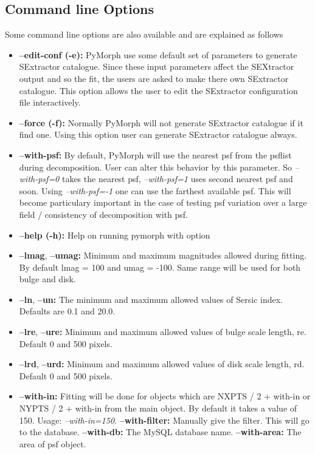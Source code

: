 \documentclass[a4paper,12pt]{article}
\begin{document}
\subsection{Command line Options}
Some command line options are also available and are explained as follows
\begin{itemize}
 \item 
\textbf{ --edit-conf (-e):} PyMorph use some default set of parameters to generate SExtractor catalogue. Since these input parameters affect the SEXtractor output and so the fit, the users are asked to make there own SExtractor  catalogue. This option allows the user to edit the SExtractor configuration file interactively.

\item
\textbf{ --force (-f): } Normally PyMorph will not generate SExtractor catalogue if it find one. Using this option user can generate SExtractor catalogue always.
\item
\textbf{ --with-psf: } By default, PyMorph will use the nearest psf from the psflist during decomposition. User can alter this behavior by this parameter. So \textit{--with-psf=0} takes the nearest psf, \textit{--with-psf=1} uses second nearest psf and soon. Using \textit{--with-psf=-1} one can use the farthest available psf. This will become particulary important in the case of testing psf variation over a large field / consistency of decomposition with psf.
\item
\textbf{ --help (-h): } Help on running pymorph with option
\item
\textbf{ --lmag}, \textbf{ --umag:} Minimum and maximum magnitudes allowed during fitting. By default lmag = 100 and umag = -100. Same range will be used for both bulge and disk.
\item
\textbf{ --ln}, \textbf{ --un: } The minimum and maximum allowed values of Sersic index. Defaults are 0.1 and 20.0.
\item
\textbf{ --lre},\textbf{ --ure: } Minimum and maximum allowed values of bulge scale length, re. Default 0 and 500 pixels.
\item
\textbf{ --lrd},\textbf{ --urd: } Minimum and maximum allowed values of disk scale length, rd. Default 0 and 500 pixels.
\item
\textbf{ --with-in: } Fitting will be done for objects which are NXPTS / 2 + with-in or NYPTS / 2 + with-in from the main object. By default it takes a value of 150. Usage: \textit{--with-in=150}.
\textbf{ --with-filter:} Manually give the filter. This will go to the database.
\textbf{ --with-db:} The MySQL database name.
\textbf{ --with-area:} The area of psf object.
\end{itemize}
\end{document}
